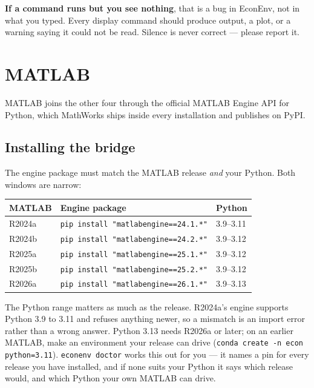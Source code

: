 \documentclass[11pt,a4paper]{report}
\begin{document}
\begin{note}
\textbf{If a command runs but you see nothing}, that is a bug in EconEnv, not in
what you typed. Every display command should produce output, a plot, or a
warning saying it could not be read. Silence is never correct --- please report
it.
\end{note}

\chapter{MATLAB}

MATLAB joins the other four through the official MATLAB Engine API for Python,
which MathWorks ships inside every installation and publishes on PyPI.

\section{Installing the bridge}

The engine package must match the MATLAB release \emph{and} your Python.
Both windows are narrow:

\begin{center}
\begin{tabular}{@{}lll@{}}
\toprule
\textbf{MATLAB} & \textbf{Engine package} & \textbf{Python} \\
\midrule
R2024a & \texttt{pip install "matlabengine==24.1.*"} & 3.9--3.11 \\
R2024b & \texttt{pip install "matlabengine==24.2.*"} & 3.9--3.12 \\
R2025a & \texttt{pip install "matlabengine==25.1.*"} & 3.9--3.12 \\
R2025b & \texttt{pip install "matlabengine==25.2.*"} & 3.9--3.12 \\
R2026a & \texttt{pip install "matlabengine==26.1.*"} & 3.9--3.13 \\
\bottomrule
\end{tabular}
\end{center}

\begin{warn}
The Python range matters as much as the release. R2024a's engine supports
Python 3.9 to 3.11 and refuses anything newer, so a mismatch is an import
error rather than a wrong answer. Python 3.13 needs R2026a or later; on an
earlier MATLAB, make an environment your release can drive
(\texttt{conda create -n econ python=3.11}). \texttt{econenv doctor} works
this out for you --- it names a pin for every release you have installed, and
if none suits your Python it says which release would, and which Python your
own MATLAB can drive.
\end{warn}
\end{document}
